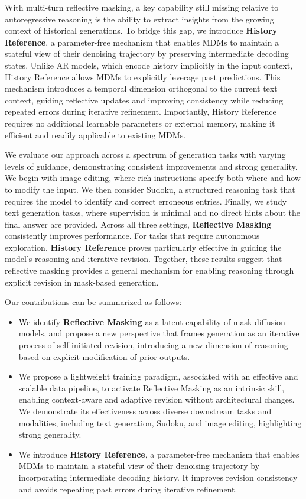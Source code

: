 \documentclass{llmxive}
\providecommand{\methodfull}{Reflective Masking\xspace}
\begin{document}
With multi-turn reflective masking, a key capability still missing relative to autoregressive reasoning is the ability to extract insights from the growing context of historical generations. To bridge this gap, we introduce \textbf{History Reference}, a parameter-free mechanism that enables MDMs to maintain a stateful view of their denoising trajectory by preserving intermediate decoding states. Unlike AR models, which encode history implicitly in the input context, History Reference allows MDMs to explicitly leverage past predictions. This mechanism introduces a temporal dimension orthogonal to the current text context, guiding reflective updates and improving consistency while reducing repeated errors during iterative refinement. Importantly, History Reference requires no additional learnable parameters or external memory, making it efficient and readily applicable to existing MDMs.

We evaluate our approach across a spectrum of generation tasks with varying levels of guidance, demonstrating consistent improvements and strong generality. We begin with image editing, where rich instructions specify both where and how to modify the input. We then consider Sudoku, a structured reasoning task that requires the model to identify and correct erroneous entries. Finally, we study text generation tasks, where supervision is minimal and no direct hints about the final answer are provided. Across all three settings, \textbf{\methodfull} consistently improves performance. For tasks that require autonomous exploration, \textbf{History Reference} proves particularly effective in guiding the model’s reasoning and iterative revision. Together, these results suggest that reflective masking provides a general mechanism for enabling reasoning through explicit revision in mask-based generation. 

Our contributions can be summarized as follows:
\begin{itemize}[leftmargin=*]
    \item We identify \textbf{\methodfull} as a latent capability of mask diffusion models, and propose a new perspective that frames generation as an iterative process of self-initiated revision, introducing a new dimension of reasoning based on explicit modification of prior outputs.

    \item We propose a lightweight training paradigm, associated with an effective and scalable data pipeline, to activate \methodfull as an intrinsic skill, enabling context-aware and adaptive revision without architectural changes. We demonstrate its effectiveness across diverse downstream tasks and modalities, including text generation, Sudoku, and image editing, highlighting strong generality.

    \item We introduce \textbf{History Reference}, a parameter-free mechanism that enables MDMs to maintain a stateful view of their denoising trajectory by incorporating intermediate decoding history. It improves revision consistency and avoids repeating past errors during iterative refinement.
\end{itemize}
\end{document}

